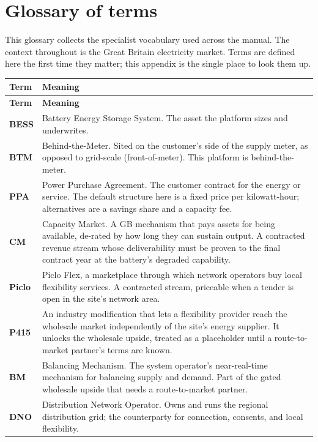 \chapter{Glossary of terms}
\label{app:glossary}

This glossary collects the specialist vocabulary used across the manual. The context throughout is the Great Britain electricity market. Terms are defined here the first time they matter; this appendix is the single place to look them up.

\renewcommand{\arraystretch}{1.35}
\small\sffamily
\begin{longtable}{@{}>{\bfseries}p{2.4cm} p{12.3cm}@{}}
\toprule
\textbf{\normalfont Term} & \textbf{\normalfont Meaning} \\
\midrule
\endfirsthead
\toprule
\textbf{\normalfont Term} & \textbf{\normalfont Meaning} \\
\midrule
\endhead
\bottomrule
\endfoot
BESS & Battery Energy Storage System. The asset the platform sizes and underwrites. \\
BTM & Behind-the-Meter. Sited on the customer's side of the supply meter, as opposed to grid-scale (front-of-meter). This platform is behind-the-meter. \\
PPA & Power Purchase Agreement. The customer contract for the energy or service. The default structure here is a fixed price per kilowatt-hour; alternatives are a savings share and a capacity fee. \\
CM & Capacity Market. A GB mechanism that pays assets for being available, de-rated by how long they can sustain output. A contracted revenue stream whose deliverability must be proven to the final contract year at the battery's degraded capability. \\
Piclo & Piclo Flex, a marketplace through which network operators buy local flexibility services. A contracted stream, priceable when a tender is open in the site's network area. \\
P415 & An industry modification that lets a flexibility provider reach the wholesale market independently of the site's energy supplier. It unlocks the wholesale upside, treated as a placeholder until a route-to-market partner's terms are known. \\
BM & Balancing Mechanism. The system operator's near-real-time mechanism for balancing supply and demand. Part of the gated wholesale upside that needs a route-to-market partner. \\
DNO & Distribution Network Operator. Owns and runs the regional distribution grid; the counterparty for connection, consents, and local flexibility. \\

\end{longtable}
